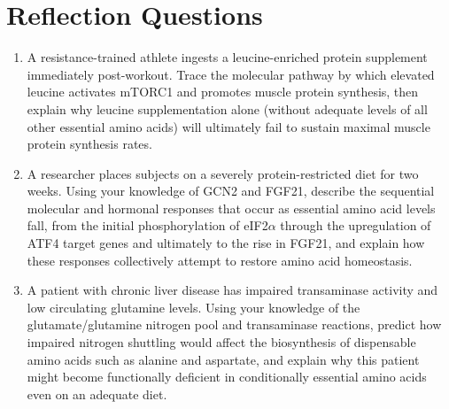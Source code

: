 \documentclass{tufte-handout}
\begin{document}
\section{Reflection Questions}
\begin{enumerate}
\item A resistance-trained athlete ingests a leucine-enriched protein supplement immediately post-workout. Trace the molecular pathway by which elevated leucine activates mTORC1 and promotes muscle protein synthesis, then explain why leucine supplementation alone (without adequate levels of all other essential amino acids) will ultimately fail to sustain maximal muscle protein synthesis rates.
\item A researcher places subjects on a severely protein-restricted diet for two weeks. Using your knowledge of GCN2 and FGF21, describe the sequential molecular and hormonal responses that occur as essential amino acid levels fall, from the initial phosphorylation of eIF2$\alpha$ through the upregulation of ATF4 target genes and ultimately to the rise in FGF21, and explain how these responses collectively attempt to restore amino acid homeostasis.
\item A patient with chronic liver disease has impaired transaminase activity and low circulating glutamine levels. Using your knowledge of the glutamate/glutamine nitrogen pool and transaminase reactions, predict how impaired nitrogen shuttling would affect the biosynthesis of dispensable amino acids such as alanine and aspartate, and explain why this patient might become functionally deficient in conditionally essential amino acids even on an adequate diet.
\end{enumerate}



\end{document}
